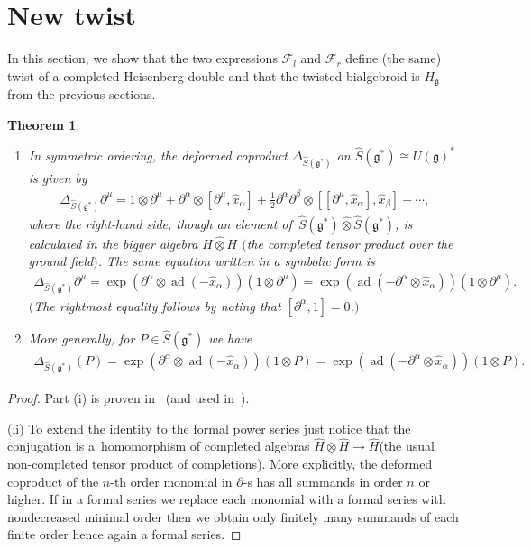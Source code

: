 \documentclass[10pt,a4paper]{amsart}
\def\gg{\mathfrak{g}}
\def\hx{\hat{x}}
\newtheorem{Theorem}{Theorem}[section]
\numberwithin{equation}{section}
\begin{document}
\section{New twist}\label{s:newtwist}

In this section, we show that the two expressions $\mathcal{F}_l$ and $\mathcal{F}_r$ define (the same) twist of a completed Heisenberg double and that the twisted bialgebroid is $H_\gg$ from the previous sections.
\begin{Theorem}\label{thm:expadDelta}\quad
\begin{enumerate}\itemsep=0pt
\item[$(i)$] In symmetric ordering, the deformed coproduct
$\Delta_{\hat{S}(\gg^*)}$ on $\hat{S}(\gg^*)\cong U(\gg)^*$ is given by
\begin{gather*}
\Delta_{\hat{S}(\gg^*)}\partial^\mu = 1\otimes\partial^\mu + \partial^\alpha\otimes[\partial^\mu,\hx_\alpha] +\tfrac{1}{2} \partial^\alpha\partial^\beta\otimes [[\partial^\mu,\hx_\alpha],\hx_\beta] +\cdots,
\end{gather*}
where the right-hand side, though an element of~$\hat{S}(\gg^*)\hat\otimes\hat{S}(\gg^*)$, is calculated in the bigger algebra $H\hat\otimes H$
$($the completed tensor product over the ground field$)$. The same equation written in a symbolic form is
\begin{gather}\label{eq:expad1}
\Delta_{\hat{S}(\gg^*)}\partial^\mu = \exp(\partial^\alpha\otimes \operatorname{ad} (-\hx_\alpha))
(1\otimes\partial^\mu) = \exp(\operatorname{ad}(-\partial^\alpha\otimes \hx_\alpha)) (1\otimes\partial^\mu).
\end{gather}
$($The rightmost equality follows by noting that $[\partial^\alpha,1] = 0$.$)$

\item[$(ii)$] More generally, for $P\in \hat{S}(\gg^*)$ we have
\begin{gather*}%
\Delta_{\hat{S}(\gg^*)} (P) = \exp(\partial^\alpha\otimes \operatorname{ad} (-\hx_\alpha))(1\otimes P) = \exp(\operatorname{ad}(-\partial^\alpha\otimes \hx_\alpha)) (1\otimes P).
\end{gather*}
\end{enumerate}
\end{Theorem}

\begin{proof} Part (i) is proven in~\cite{scopr} (and used in~\cite{heisd}).

(ii) To extend the identity to the formal power series just notice that the conjugation is a~homomorphism of completed algebras $\hat{H}\otimes\hat{H}\to\hat{H}$(the usual non-completed tensor product of completions). More explicitly, the deformed coproduct of the $n$-th order monomial in $\partial$-s has all summands in order $n$ or higher. If in a formal series we replace each monomial with a formal series with
nondecreased minimal order then we obtain only finitely many summands of each finite order hence again a formal series.
\end{proof}
\end{document}
